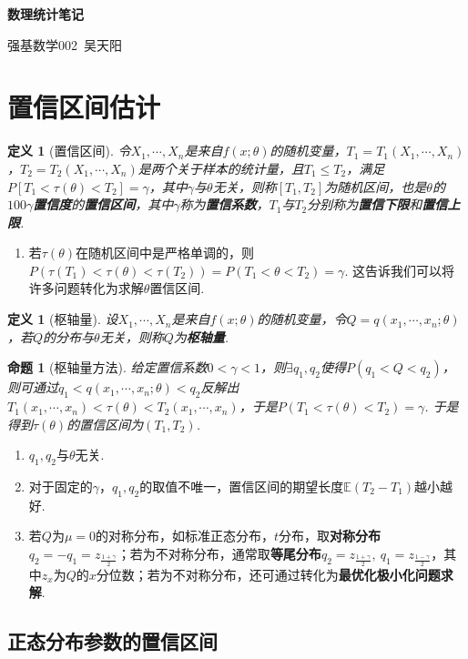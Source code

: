 \documentclass[12pt, a4paper, oneside]{ctexart}
\newtheorem{definition}[theorem]{定义}
\newtheorem{proposition}[theorem]{命题}
\numberwithin{equation}{section}  %
\newenvironment{myTitle}[1]{
    \begin{center}
    {\zihao{-2}\bf #1\\}
    \zihao{-4}\it
}{\end{center}}  %
\newenvironment{remark}{\begin{enumerate}[label=\textbf{注\arabic*.}]}{\end{enumerate}}
\let\leq=\leqslant %
\def\E{\mathbb{E}}          %
\begin{document}
\begin{myTitle}{数理统计笔记}
    强基数学002\ 吴天阳
\end{myTitle}
\section{置信区间估计}
\begin{definition}[置信区间]
    令$X_1,\cdots,X_n$是来自$f(x;\theta)$的随机变量，$T_1=T_1(X_1,\cdots,X_n)$，$T_2=T_2(X_1,\cdots,X_n)$是两个关于样本的统计量，且$T_1\leq T_2$，满足$P[T_1 < \tau(\theta) < T_2]=\gamma$，其中$\gamma$与$\theta$无关，则称$[T_1,T_2]$为随机区间，也是$\theta$的$100\gamma$\textbf{置信度}的\textbf{置信区间}，其中$\gamma$称为\textbf{置信系数}，$T_1$与$T_2$分别称为\textbf{置信下限}和\textbf{置信上限}.
\end{definition}
\begin{remark}
    \item 若$\tau(\theta)$在随机区间中是严格单调的，则$P(\tau(T_1) < \tau(\theta) < \tau(T_2)) = P(T_1 < \theta < T_2) = \gamma$. 这告诉我们可以将许多问题转化为求解$\theta$置信区间.
\end{remark}

\begin{definition}[枢轴量]
    设$X_1,\cdots, X_n$是来自$f(x;\theta)$的随机变量，令$Q = q(x_1,\cdots,x_n;\theta)$，若$Q$的分布与$\theta$无关，则称$Q$为\textbf{枢轴量}.
\end{definition}
\begin{proposition}[枢轴量方法]
    给定置信系数$0<\gamma<1$，则$\exists q_1,q_2$使得$P(q_1<Q<q_2)$，则可通过$q_1<q(x_1,\cdots, x_n;\theta)<q_2$反解出$T_1(x_1,\cdots, x_n)<\tau(\theta)<T_2(x_1,\cdots,x_n)$，于是$P(T_1<\tau(\theta)<T_2)=\gamma$. 于是得到$\tau(\theta)$的置信区间为$(T_1,T_2)$.
\end{proposition}
\begin{remark}
    \item $q_1,q_2$与$\theta$无关.
    \item 对于固定的$\gamma$，$q_1,q_2$的取值不唯一，置信区间的期望长度$\E(T_2-T_1)$越小越好.
    \item 若$Q$为$\mu=0$的对称分布，如标准正态分布，$t$分布，取\textbf{对称分布}$q_2=-q_1 = z_{\frac{1+\gamma}{2}}$；若为不对称分布，通常取\textbf{等尾分布}$q_2=z_{\frac{1+\gamma}{2}},\ q_1 = z_{\frac{1-\gamma}{2}}$，其中$z_x$为$Q$的$x$分位数；若为不对称分布，还可通过转化为\textbf{最优化极小化问题求解}.
\end{remark}
\subsection{正态分布参数的置信区间}
\end{document}
